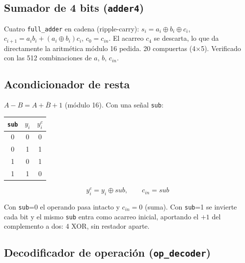 \documentclass[11pt,a4paper]{article}
\newcommand{\sig}[1]{\texttt{#1}}
\newcommand{\nott}[1]{\overline{#1}}
\begin{document}
\subsection{Sumador de 4 bits (\sig{adder4})}

Cuatro \sig{full\_adder} en cadena (ripple-carry): $s_i = a_i\oplus b_i\oplus c_i$, $c_{i+1} = a_ib_i + (a_i\oplus b_i)c_i$, $c_0 = c_{in}$. El acarreo $c_4$ se descarta, lo que da directamente la aritmética módulo 16 pedida. 20 compuertas (4$\times$5). Verificado con las 512 combinaciones de $a$, $b$, $c_{in}$.

\subsection{Acondicionador de resta}

$A-B = A+\nott{B}+1$ (módulo 16). Con una señal \sig{sub}:

\begin{minipage}[t]{0.4\textwidth}
\vspace{0pt}\centering
\begin{tabular}{@{}cc|c@{}}
\toprule
\sig{sub} & $y_i$ & $y^c_i$ \\
\midrule
0&0&0\\ 0&1&1\\ 1&0&1\\ 1&1&0\\
\bottomrule
\end{tabular}
\end{minipage}
\begin{minipage}[t]{0.5\textwidth}
\vspace{0pt}
\[ y^c_i = y_i \oplus \mathit{sub}, \qquad c_{in} = \mathit{sub} \]
\end{minipage}

Con \sig{sub}=0 el operando pasa intacto y $c_{in}=0$ (suma). Con \sig{sub}=1 se invierte cada bit y el mismo \sig{sub} entra como acarreo inicial, aportando el $+1$ del complemento a dos: 4 XOR, sin restador aparte.

\subsection{Decodificador de operación (\sig{op\_decoder})}
\label{sec:decoder}
\end{document}
